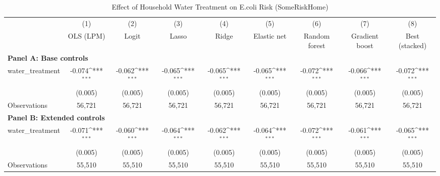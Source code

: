 \begin{table}[htbp]\centering
\caption{Effect of Household Water Treatment on E.coli Risk (SomeRiskHome)}
\newcommand{\sym}[1]{\ifmmode^{#1}\else\(^{#1}\)\fi}
\begin{tabular}{l*{8}{c}}
\toprule
            &\multicolumn{1}{c}{(1)}&\multicolumn{1}{c}{(2)}&\multicolumn{1}{c}{(3)}&\multicolumn{1}{c}{(4)}&\multicolumn{1}{c}{(5)}&\multicolumn{1}{c}{(6)}&\multicolumn{1}{c}{(7)}&\multicolumn{1}{c}{(8)}\\
            &\multicolumn{1}{c}{OLS (LPM)}&\multicolumn{1}{c}{Logit}&\multicolumn{1}{c}{Lasso}&\multicolumn{1}{c}{Ridge}&\multicolumn{1}{c}{Elastic net}&\multicolumn{1}{c}{Random forest}&\multicolumn{1}{c}{Gradient boost}&\multicolumn{1}{c}{Best (stacked)}\\
\multicolumn{9}{l}{\textbf{Panel A: Base controls}}\\
\midrule
water\_treatment&      -0.074\sym{***}&      -0.062\sym{***}&      -0.065\sym{***}&      -0.065\sym{***}&      -0.065\sym{***}&      -0.072\sym{***}&      -0.066\sym{***}&      -0.072\sym{***}\\
            &     (0.005)         &     (0.005)         &     (0.005)         &     (0.005)         &     (0.005)         &     (0.005)         &     (0.005)         &     (0.005)         \\
\midrule
Observations&      56,721         &      56,721         &      56,721         &      56,721         &      56,721         &      56,721         &      56,721         &      56,721         \\

\midrule
\multicolumn{9}{l}{\textbf{Panel B: Extended controls}}\\
\midrule

water\_treatment&      -0.071\sym{***}&      -0.060\sym{***}&      -0.064\sym{***}&      -0.062\sym{***}&      -0.064\sym{***}&      -0.072\sym{***}&      -0.061\sym{***}&      -0.065\sym{***}\\
            &     (0.005)         &     (0.005)         &     (0.005)         &     (0.005)         &     (0.005)         &     (0.005)         &     (0.005)         &     (0.005)         \\
\midrule
Observations&      55,510         &      55,510         &      55,510         &      55,510         &      55,510         &      55,510         &      55,510         &      55,510         \\
\bottomrule\end{tabular}\end{table}
